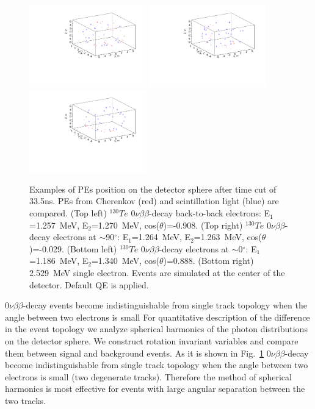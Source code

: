 \documentclass[12pt,twoside,letterpaper]{article}
\newcommand{\vbb}{0\nu\beta\beta}
\newcommand{\Te}{^{130}Te}
\begin{document}
\begin{figure}[htb]
\centering
\includegraphics[angle=0,width=0.45\textwidth]{plots/hDisplay_Te130_evt124_e1257_e1270_cos-0908}
\includegraphics[angle=0,width=0.45\textwidth]{plots/hDisplay_Te130_evt131_e1264_e1263_cos-0029}
\includegraphics[angle=0,width=0.45\textwidth]{plots/hDisplay_Te130_evt352_e1186_e1340_cos0888}
\caption{Examples of PEs position on the detector sphere after time cut of 33.5ns. PEs from Cherenkov (red) and scintillation light (blue) are compared. (Top left) $\Te$ $\vbb$-decay back-to-back electrons: E$_1$=1.257~MeV, E$_2$=1.270~MeV, cos($\theta$)=-0.908. (Top right) $\Te$ $\vbb$-decay electrons at $\sim$90$^{\circ}$:  E$_1$=1.264~MeV, E$_2$=1.263~MeV, cos($\theta$)=-0.029. (Bottom left) $\Te$ $\vbb$-decay electrons at $\sim$0$^{\circ}$:  E$_1$=1.186~MeV, E$_2$=1.340~MeV, cos($\theta$)=0.888. (Bottom right) 2.529~MeV single electron. Events are simulated at the center of the detector. Default QE is applied.}
\label{fig:Display_Te130}
\end{figure}


$\vbb$-decay events become indistinguishable from single track topology when the angle between two electrons is small
For quantitative description of the difference in the event topology we analyze spherical harmonics of the photon distributions on the detector sphere. We construct rotation invariant variables and compare them between signal and background events. As it is shown in Fig.~\ref{fig:Display_Te130} $\vbb$-decay become indistinguishable from single track topology when the angle between two electrons is small (two degenerate tracks). Therefore the method of spherical harmonics is most effective for events with large angular separation between the two tracks. 
\end{document}
